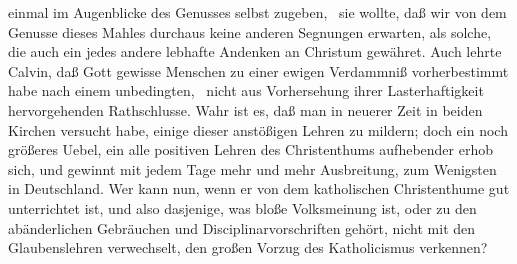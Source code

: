 \begin{aufza}
einmal im Augenblicke des Genusses selbst zugeben, \dh\  sie wollte, daß wir von dem Genusse dieses Mahles durchaus keine anderen Segnungen erwarten, als solche, die auch ein jedes andere lebhafte Andenken an Christum gewähret. Auch lehrte Calvin, daß Gott gewisse Menschen zu einer ewigen Verdammniß vorherbestimmt habe nach einem unbedingten, \dh\  nicht aus Vorhersehung ihrer Lasterhaftigkeit hervorgehenden Rathschlusse. Wahr ist es, daß man in neuerer Zeit in beiden Kirchen versucht habe, einige dieser anstößigen Lehren zu mildern; doch ein noch größeres Uebel, ein alle positiven Lehren des Christenthums aufhebender  erhob sich, und gewinnt mit jedem Tage mehr und mehr Ausbreitung, zum Wenigsten in Deutschland. Wer kann nun, wenn er von dem katholischen Christenthume gut unterrichtet ist, und also dasjenige, was bloße Volksmeinung ist, oder zu den abänderlichen Gebräuchen und Disciplinarvorschriften gehört, nicht mit den Glaubenslehren verwechselt, den großen Vorzug des Katholicismus verkennen?

\end{aufza}
